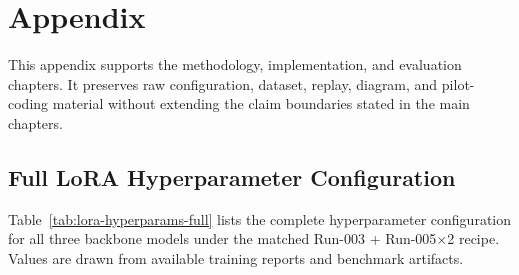 \chapter{Appendix}\label{ch:appendix}

This appendix supports the methodology, implementation, and evaluation
chapters. It preserves raw configuration, dataset, replay, diagram, and
pilot-coding material without extending the claim boundaries stated in the
main chapters.

\section{Full LoRA Hyperparameter Configuration}\label{sec:appendix-hyperparams}

Table~\ref{tab:lora-hyperparams-full} lists the complete hyperparameter
configuration for all three backbone models under the matched Run-003 +
Run-005$\times$2 recipe. Values are drawn from available training reports
and benchmark artifacts.

